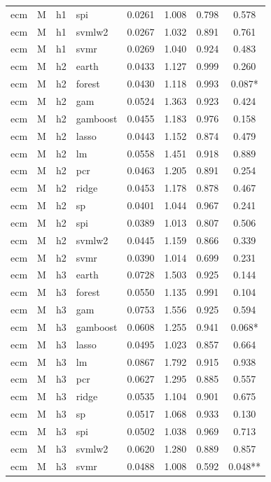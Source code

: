 \begin{ThreePartTable}
\begin{longtable}[t]{llclcccc}
ecm & M & h1 & spi & 0.0261 & 1.008 & 0.798 & 0.578\\
ecm & M & h1 & svmlw2 & 0.0267 & 1.032 & 0.891 & 0.761\\
ecm & M & h1 & svmr & 0.0269 & 1.040 & 0.924 & 0.483\\
\addlinespace
ecm & M & h2 & earth & 0.0433 & 1.127 & 0.999 & 0.260\\
ecm & M & h2 & forest & 0.0430 & 1.118 & 0.993 & 0.087*\\
ecm & M & h2 & gam & 0.0524 & 1.363 & 0.923 & 0.424\\
ecm & M & h2 & gamboost & 0.0455 & 1.183 & 0.976 & 0.158\\
ecm & M & h2 & lasso & 0.0443 & 1.152 & 0.874 & 0.479\\
ecm & M & h2 & lm & 0.0558 & 1.451 & 0.918 & 0.889\\
ecm & M & h2 & pcr & 0.0463 & 1.205 & 0.891 & 0.254\\
ecm & M & h2 & ridge & 0.0453 & 1.178 & 0.878 & 0.467\\
ecm & M & h2 & sp & 0.0401 & 1.044 & 0.967 & 0.241\\
ecm & M & h2 & spi & 0.0389 & 1.013 & 0.807 & 0.506\\
ecm & M & h2 & svmlw2 & 0.0445 & 1.159 & 0.866 & 0.339\\
ecm & M & h2 & svmr & 0.0390 & 1.014 & 0.699 & 0.231\\
\addlinespace
ecm & M & h3 & earth & 0.0728 & 1.503 & 0.925 & 0.144\\
ecm & M & h3 & forest & 0.0550 & 1.135 & 0.991 & 0.104\\
ecm & M & h3 & gam & 0.0753 & 1.556 & 0.925 & 0.594\\
ecm & M & h3 & gamboost & 0.0608 & 1.255 & 0.941 & 0.068*\\
ecm & M & h3 & lasso & 0.0495 & 1.023 & 0.857 & 0.664\\
ecm & M & h3 & lm & 0.0867 & 1.792 & 0.915 & 0.938\\
ecm & M & h3 & pcr & 0.0627 & 1.295 & 0.885 & 0.557\\
ecm & M & h3 & ridge & 0.0535 & 1.104 & 0.901 & 0.675\\
ecm & M & h3 & sp & 0.0517 & 1.068 & 0.933 & 0.130\\
ecm & M & h3 & spi & 0.0502 & 1.038 & 0.969 & 0.713\\
ecm & M & h3 & svmlw2 & 0.0620 & 1.280 & 0.889 & 0.857\\
ecm & M & h3 & svmr & 0.0488 & 1.008 & 0.592 & 0.048**\\

\end{longtable}
\end{ThreePartTable}
